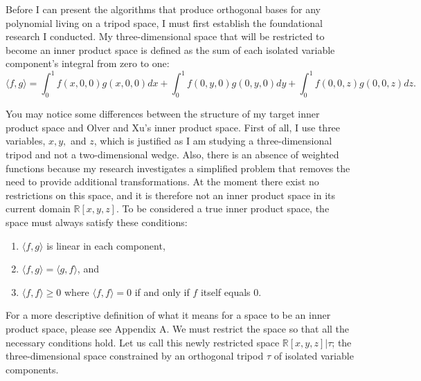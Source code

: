 \documentclass[letterpaper, 12pt]{article}
\begin{document}
Before I can present the algorithms that produce orthogonal bases for any polynomial living on a tripod space, I must first establish the foundational research I conducted. My three-dimensional space that will be restricted to become an inner product space is defined as the sum of each isolated variable component's integral from zero to one: $$\langle f, g\rangle = \int_0^1 f(x,0,0)g(x,0,0) dx + \int_0^1 f(0,y,0)g(0,y,0) dy + \int_0^1 f(0,0,z)g(0,0,z) dz.$$

\noindent You may notice some differences between the structure of my target inner product space and Olver and Xu's inner product space. First of all, I use three variables, $x, y,$ and $z$, which is justified as I am studying a three-dimensional tripod and not a two-dimensional wedge. Also, there is an absence of weighted functions because my research investigates a simplified problem that removes the need to provide additional transformations. At the moment there exist no restrictions on this space, and it is therefore not an inner product space in its current domain $\mathbb{R} [x, y, z]$. To be considered a true inner product space, the space must always satisfy these conditions:

\vspace*{2mm}
\begin{enumerate}
	\singlespacing
	\item $\langle f, g\rangle$ is linear in each component,
	\item $\langle f, g\rangle = \langle g, f\rangle$, and
	\item $\langle f, f\rangle \geq 0$ where $\langle f, f\rangle=0$ if and only if $f$ itself equals $0$.
\end{enumerate}

\doublespacing
\noindent For a more descriptive definition of what it means for a space to be an inner product space, please see Appendix A. We must restrict the space so that all the necessary conditions hold. Let us call this newly restricted space $\mathbb{R} [x, y, z] | \tau$; the three-dimensional space constrained by an orthogonal tripod $\tau$ of isolated variable components.
\end{document}
